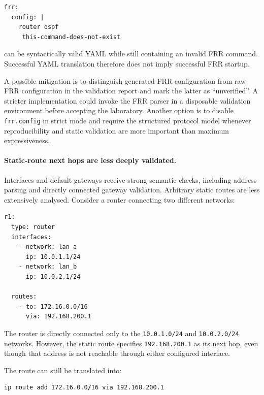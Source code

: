 \begin{lstlisting}[caption={Raw FRR content that cannot be fully validated by the YAML model.},
label={lst:raw-frr-example}]
frr:
  config: |
    router ospf
     this-command-does-not-exist
\end{lstlisting}

can be syntactically valid YAML while still containing an invalid FRR command.
Successful YAML translation therefore does not imply successful FRR startup.

A possible mitigation is to distinguish generated FRR configuration from raw
FRR configuration in the validation report and mark the latter as
``unverified''. A stricter implementation could invoke the FRR parser in a
disposable validation environment before accepting the laboratory. Another
option is to disable \texttt{frr.config} in strict mode and require the
structured protocol model whenever reproducibility and static validation are
more important than maximum expressiveness.

\paragraph{Static-route next hops are less deeply validated.}

Interfaces and default gateways receive strong semantic checks, including address parsing and directly connected gateway validation. Arbitrary static routes are less extensively analysed. Consider a router connecting two different networks:

\begin{lstlisting}[caption={Static route with a next hop outside the router's connected subnets.},
label={lst:static-route-weakness}]
r1:
  type: router
  interfaces:
    - network: lan_a
      ip: 10.0.1.1/24
    - network: lan_b
      ip: 10.0.2.1/24

  routes:
    - to: 172.16.0.0/16
      via: 192.168.200.1
\end{lstlisting}

The router is directly connected only to the \texttt{10.0.1.0/24} and \texttt{10.0.2.0/24} networks. However, the static route specifies \texttt{192.168.200.1} as its next hop, even though that address is not reachable through either configured interface.

The route can still be translated into:

\begin{lstlisting}[language=bash]
ip route add 172.16.0.0/16 via 192.168.200.1
\end{lstlisting}

